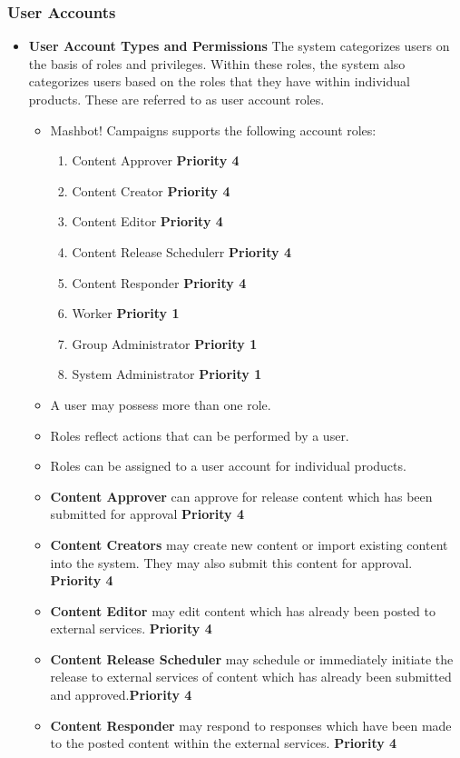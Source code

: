 \documentclass{report}
\begin{document}
		\subsubsection{User Accounts} %
			\begin{itemize}
				\item \textbf{User Account Types and Permissions} The system categorizes users on the basis
				of roles and privileges. Within these roles, the system also categorizes users based on
			 	the roles that they have within individual products.	These are referred to as user 
				account roles.
				\begin{itemize}
					\item Mashbot! Campaigns supports the following account roles:
						\begin{enumerate}
							\item Content Approver \textbf{Priority 4} 
							\item Content Creator \textbf{Priority 4} 
							\item Content Editor \textbf{Priority 4} 
							
							\item Content Release Schedulerr \textbf{Priority 4}  
							\item Content Responder \textbf{Priority 4}
						   	\item Worker \textbf{Priority 1}	
							\item Group Administrator \textbf{Priority 1}   
							\item System Administrator \textbf{Priority 1}  
						\end{enumerate}
					\item A user may possess more than one role.
					\item Roles reflect actions that can be performed by a user.
					\item Roles can be assigned to a user account for individual products.
					\item \textbf{Content Approver} can approve for release content which has been
					submitted for approval \textbf{Priority 4}
					\item \textbf{Content Creators} may create new content or 
					import existing content into the system. They may also 
					submit this content for approval. \textbf{Priority 4}
					\item \textbf{Content Editor} may edit content which has already been posted to external
					services. \textbf{Priority 4} 
					\item \textbf{Content Release Scheduler} may schedule or 
					immediately initiate the release to external services of 
					content which has already been submitted and 
					approved.\textbf{Priority 4}  
					\item \textbf{Content Responder} may respond to responses 
					which have been made to the posted content within the 
					external services.  \textbf{Priority 4} 
					

\end{itemize}
\end{itemize}
\end{document}
